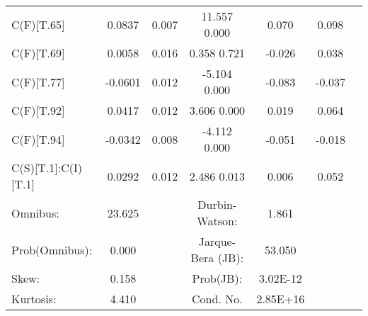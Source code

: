\begin{table}[htp]
\begin{center}
\begin{tabular}{lcccccr}
C(F)[T.65]           	&	0.0837	&	0.007	&	   11.557      0.000      	&	0.070	&	0.098	\\
C(F)[T.69]           	&	0.0058	&	0.016	&	    0.358      0.721      	&	-0.026	&	0.038	\\
C(F)[T.77]           	&	-0.0601	&	0.012	&	   -5.104      0.000      	&	-0.083	&	-0.037	\\
C(F)[T.92]           	&	0.0417	&	0.012	&	    3.606      0.000      	&	0.019	&	0.064	\\
C(F)[T.94]           	&	-0.0342	&	0.008	&	   -4.112      0.000      	&	-0.051	&	-0.018	\\
C(S)[T.1]:C(I)[T.1]  	&	0.0292	&	0.012	&	    2.486      0.013      	&	0.006	&	0.052	\\
\hline											
Omnibus:             	&	23.625	&		&	Durbin-Watson:               	&	1.861	&		\\
Prob(Omnibus):       	&	0.000	&		&	Jarque-Bera (JB):            	&	53.050	&		\\
Skew:                	&	0.158	&		&	Prob(JB):                    	&	3.02E-12	&		\\
Kurtosis:            	&	4.410	&		&	Cond. No.                    	&	2.85E+16	&		\\
\hline											
											
											
											
											\end{tabular}
\end{center}
\label{default}
\end{table}%
